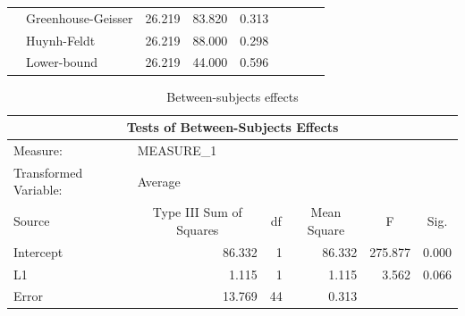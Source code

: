 \documentclass[a4paper]{article}
\begin{document}
\begin{table}[H]
\begin{tabular}{p{}p{}|l|r|r|r|r|r|}
\cline{2-7}
                                                        & Greenhouse-Geisser & 26.219                                       & 83.820                  & 0.313                            & \multicolumn{1}{l|}{~} & \multicolumn{1}{l|}{~}     \\ 
\cline{2-7}
                                                        & Huynh-Feldt        & 26.219                                       & 88.000                  & 0.298                            & \multicolumn{1}{l|}{~} & \multicolumn{1}{l|}{~}     \\ 
\cline{2-7}
                                                        & Lower-bound        & 26.219                                       & 44.000                  & 0.596                            & \multicolumn{1}{l|}{~} & \multicolumn{1}{l|}{~}     \\
\hline
\end{tabular}
\end{table}



\begin{table}[H]
\centering
\caption{Between-subjects effects}
\label{tab:between3}
\begin{tabular}{|l|r|r|r|l|l|} 
\hline
\multicolumn{6}{|c|}{Tests of Between-Subjects Effects}                                                                                                                                         \\ 
\hline
Measure:~              & \multicolumn{1}{l|}{MEASURE\_1}              & \multicolumn{1}{l|}{}   & \multicolumn{1}{l|}{}            &                              &                             \\ 
\hline
Transformed Variable:~ & \multicolumn{1}{l|}{Average}                 & \multicolumn{1}{l|}{}   & \multicolumn{1}{l|}{}            &                              &                             \\ 
\hline
Source                 & \multicolumn{1}{c|}{Type III Sum of Squares} & \multicolumn{1}{c|}{df} & \multicolumn{1}{c|}{Mean Square} & \multicolumn{1}{c|}{F}       & \multicolumn{1}{c|}{Sig.}   \\ 
\hline
Intercept              & 86.332                                       & 1                       & 86.332                           & \multicolumn{1}{r|}{275.877} & \multicolumn{1}{r|}{0.000}  \\ 
\hline
L1                     & 1.115                                        & 1                       & 1.115                            & \multicolumn{1}{r|}{3.562}   & \multicolumn{1}{r|}{0.066}  \\ 
\hline
Error                  & 13.769                                       & 44                      & 0.313                            & ~                            & ~                           \\
\hline
\end{tabular}
\end{table}
\end{document}
